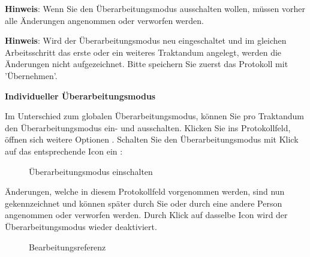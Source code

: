 \textbf{Hinweis}: Wenn Sie den Überarbeitungsmodus ausschalten wollen, müssen vorher alle Änderungen angenommen oder verworfen werden.

\vspace{\baselineskip}

\textbf{Hinweis}: Wird der Überarbeitungsmodus neu eingeschaltet und im gleichen Arbeitsschritt das erste oder ein weiteres Traktandum angelegt, werden die Änderungen nicht aufgezeichnet. Bitte speichern Sie zuerst das Protokoll mit 'Übernehmen'. 

\vspace{\baselineskip}

\textbf{Individueller Überarbeitungsmodus}

\vspace{\baselineskip}

\begin{sloppypar}

Im Unterschied zum globalen Überarbeitungsmodus, können Sie pro Traktandum den Überarbeitungsmodus ein- und ausschalten. Klicken Sie ins Protokollfeld, öffnen sich weitere Optionen . Schalten Sie den Überarbeitungsmodus mit Klick auf das entsprechende Icon ein :

\end{sloppypar}

\begin{figure}[H]
\caption{Überarbeitungsmodus einschalten}
\end{figure}

Änderungen, welche in diesem Protokollfeld vorgenommen werden, sind nun gekennzeichnet und können später durch Sie oder durch eine andere Person angenommen oder verworfen werden. Durch Klick auf dasselbe Icon  wird der Überarbeitungsmodus wieder deaktiviert.

\begin{figure}[H]
\caption{Bearbeitungsreferenz}
\end{figure}

